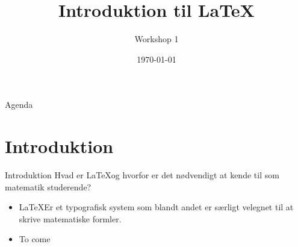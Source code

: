 \documentclass[10pt]{beamer}
\title{Introduktion til \LaTeX}
\subtitle{Workshop 1}
\date{\today}
\begin{document}
{\aauwavesbg
  \begin{frame}
  \titlepage
\end{frame}}

\begin{frame}{Agenda}{}
\tableofcontents
\end{frame}

\section{Introduktion}
\begin{frame}{Introduktion}
  Hvad er \LaTeX og hvorfor er det nødvendigt at kende til som matematik studerende?
  \begin{itemize}
  \item<1-> \LaTeX Er et typografisk system som blandt andet er særligt velegnet til at skrive matematiske formler.
  \item<2-> To come
  \end{itemize}
\end{frame}

\end{document}
